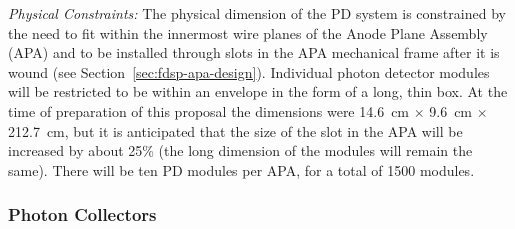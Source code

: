 
\emph{Physical Constraints:} The physical dimension of the PD system is constrained by the need to fit within the innermost wire planes of the Anode Plane Assembly (APA) and to be installed through slots in the APA mechanical frame after it is wound (see Section~\ref{sec:fdsp-apa-design}). 
Individual photon detector modules will be restricted to be within an envelope in the form of a long, thin box. At the time of preparation of this proposal the dimensions were \SI{14.6}{cm} $\times$ \SI{9.6}{cm} $\times$ \SI{212.7}{cm}, but it is anticipated that the size of the slot in the APA will be increased by about 25\% (the long dimension of the modules will remain the same). There will be ten PD modules per APA, for a total of \num{1500} modules.


\subsubsection{Photon Collectors} 
\label{sssec:photoncollectors}

